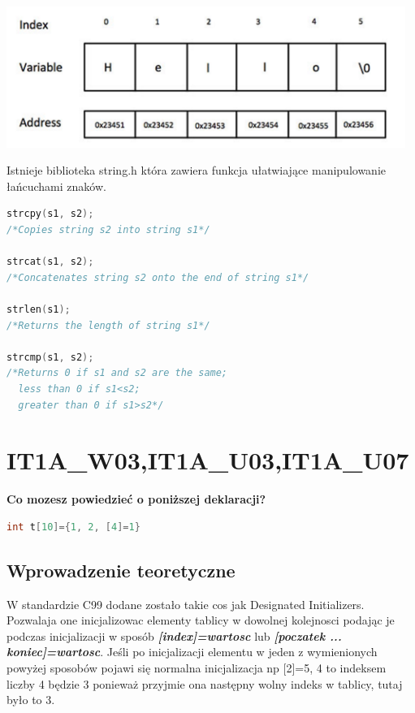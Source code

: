 \begin{center}
\includegraphics[width=13cm]{01/string-in-c}
\end{center}

Istnieje biblioteka string.h która zawiera funkcja ułatwiające manipulowanie łańcuchami znaków.
\begin{lstlisting}[language=c]
strcpy(s1, s2); 
/*Copies string s2 into string s1*/

strcat(s1, s2);
/*Concatenates string s2 onto the end of string s1*/

strlen(s1);
/*Returns the length of string s1*/

strcmp(s1, s2);
/*Returns 0 if s1 and s2 are the same;
  less than 0 if s1<s2;
  greater than 0 if s1>s2*/
\end{lstlisting}


\section{IT1A\_W03,IT1A\_U03,IT1A\_U07}
\textbf{Co mozesz powiedzieć o poniższej deklaracji?}
\begin{lstlisting}[language=c]
int t[10]={1, 2, [4]=1}
\end{lstlisting}

\subsection{Wprowadzenie teoretyczne}
W standardzie C99 dodane zostało takie cos jak Designated Initializers. Pozwalaja one inicjalizowac elementy tablicy w dowolnej kolejnosci podając je podczas inicjalizacji w sposób \textbf{\textit{[index]=wartosc}} lub \textbf{\textit{[poczatek ... koniec]=wartosc}}. Jeśli po inicjalizacji elementu w jeden z wymienionych powyżej sposobów pojawi się normalna inicjalizacja np {[2]=5, 4} to indeksem liczby 4 będzie 3 ponieważ przyjmie ona następny wolny indeks w tablicy, tutaj było to 3.


